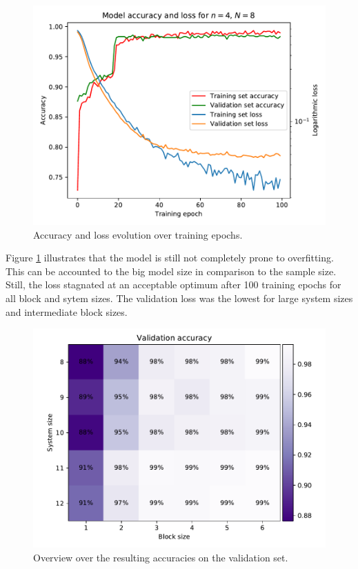 \documentclass[reprint,amsmath,amssymb,aps,prb]{revtex4-2}
\begin{document}
\begin{figure}[h!]
	\centering
	\includegraphics[width=\linewidth]{../results/accuracy_loss_epochs/N8n4_accuracy_loss_epochs}
	\caption{Accuracy and loss evolution over training epochs.}
	\label{fig:accuracy_loss_epochs}
\end{figure}

Figure \ref{fig:accuracy_loss_epochs} illustrates that the model is still not completely prone to overfitting. This can be accounted to the big model size in comparison to the sample size. Still, the loss stagnated at an acceptable optimum after 100 training epochs for all block and sytem sizes. The validation loss was the lowest for large system sizes and intermediate block sizes. 

\begin{figure}[h!]
	\centering
	\includegraphics[width=\linewidth]{../results/accuracy_loss_epochs/all_validation_accuracy}
	\caption{Overview over the resulting accuracies on the validation set.}
	\label{fig:all_validation_accuracy}
\end{figure}
\end{document}
